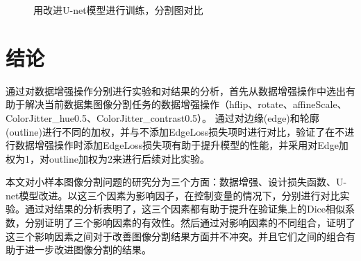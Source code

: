 \documentclass[AutoFakeBold]{LZUThesis}
\begin{document}
\begin{figure}[htbp]
    \centering
    \quad
    \quad
    \quad
    \centering
    \caption{用改进U-net模型进行训练，分割图对比}
    \label{unet1_mask_compare}
\end{figure}
\section{结论}
通过对数据增强操作分别进行实验和对结果的分析，首先从数据增强操作中选出有助于解决当前数据集图像分割任务的数据增强操作（hflip、rotate、affineScale、ColorJitter\_hue0.5、ColorJitter\_contrast0.5）。
通过对边缘(edge)和轮廓(outline)进行不同的加权，并与不添加EdgeLoss损失项时进行对比，验证了在不进行数据增强操作时添加EdgeLoss损失项有助于提升模型的性能，并采用对Edge加权为1，对outline加权为2来进行后续对比实验。

本文对小样本图像分割问题的研究分为三个方面：数据增强、设计损失函数、U-net模型改进。以这三个因素为影响因子，在控制变量的情况下，分别进行对比实验。通过对结果的分析表明了，这三个因素都有助于提升在验证集上的Dice相似系数，分别证明了三个影响因素的有效性。然后通过对影响因素的不同组合，证明了这三个影响因素之间对于改善图像分割结果方面并不冲突。并且它们之间的组合有助于进一步改进图像分割的结果。
\end{document}
